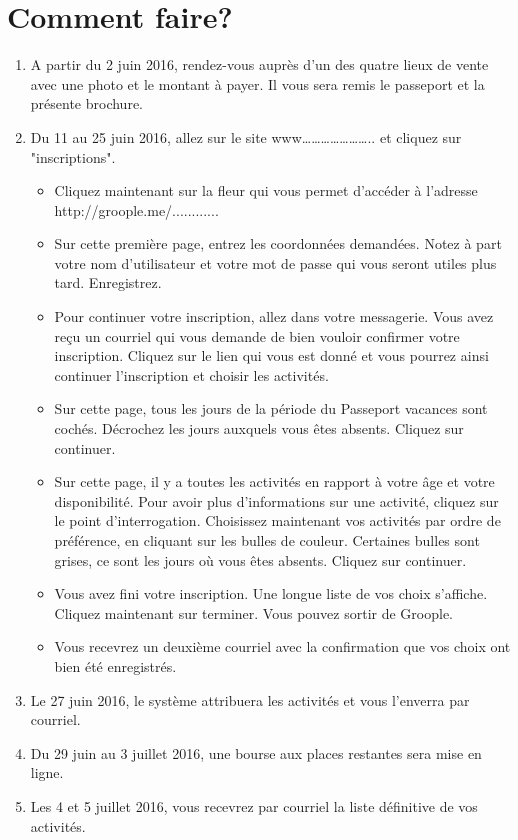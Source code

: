 \section*{Comment faire?}
\begin{enumerate}
\item A partir du 2 juin 2016, rendez-vous auprès d'un des quatre lieux de vente
avec une photo et le montant à payer. Il vous sera remis le passeport et la
présente brochure.
\item Du 11 au 25 juin 2016, allez sur le site www………………….. et cliquez sur
"inscriptions".
\begin{itemize}
\item Cliquez maintenant sur la fleur qui vous permet d'accéder à l'adresse
http://groople.me/............
\item Sur cette première page, entrez les coordonnées demandées. Notez à part
votre nom d'utilisateur et votre mot de passe qui vous seront utiles plus
tard. Enregistrez.
\item Pour continuer votre inscription, allez dans votre messagerie. Vous avez
reçu un courriel qui vous demande de bien vouloir confirmer votre
inscription. Cliquez sur le lien qui vous est donné et vous pourrez ainsi
continuer l'inscription et choisir les activités.
\item Sur cette page, tous les jours de la période du Passeport vacances sont
cochés. Décrochez les jours auxquels vous êtes absents. Cliquez sur
continuer.
\item Sur cette page, il y a toutes les activités en rapport à votre âge et votre
disponibilité. Pour avoir plus d'informations sur une activité, cliquez sur le
point d'interrogation. Choisissez maintenant vos activités par ordre de
préférence, en cliquant sur les bulles de couleur. Certaines bulles sont
grises, ce sont les jours où vous êtes absents. Cliquez sur continuer.
\item Vous avez fini votre inscription. Une longue liste de vos choix s'affiche.
Cliquez maintenant sur terminer. Vous pouvez sortir de Groople.
\item Vous recevrez un deuxième courriel avec la confirmation que vos choix ont
bien été enregistrés.
\end{itemize}
\item Le 27 juin 2016, le système attribuera les activités et vous l'enverra par
courriel.
\item Du 29 juin au 3 juillet 2016, une bourse aux places restantes sera mise en
ligne.
\item Les 4 et 5 juillet 2016, vous recevrez par courriel la liste définitive de vos
activités.
\end{enumerate}

